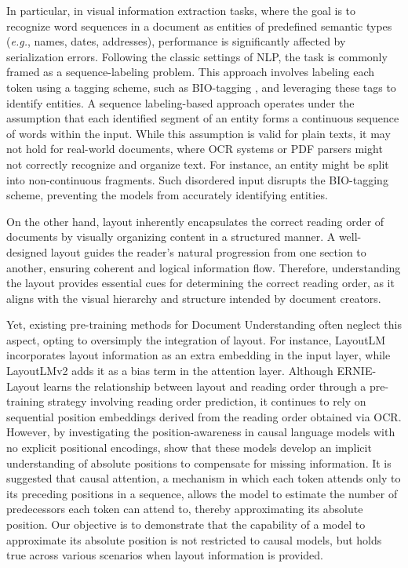 
In particular, in visual information extraction tasks, where the goal is to recognize word sequences in a document as entities of predefined semantic types (\textit{e.g.}, names, dates, addresses), performance is significantly affected by serialization errors. Following the classic settings of \ac{NLP}, the task is commonly framed as a sequence-labeling problem. This approach involves labeling each token using a tagging scheme, such as BIO-tagging \citep{ramshaw1999text}, and leveraging these tags to identify entities. A sequence labeling-based approach operates under the assumption that each identified segment of an entity forms a continuous sequence of words within the input. While this assumption is valid for plain texts, it may not hold for real-world documents, where \ac{OCR} systems or PDF parsers might not correctly recognize and organize text. For instance, an entity might be split into non-continuous fragments. Such disordered input disrupts the BIO-tagging scheme, preventing the models from accurately identifying entities.

On the other hand, layout inherently encapsulates the correct reading order of documents by visually organizing content in a structured manner. A well-designed layout guides the reader's natural progression from one section to another, ensuring coherent and logical information flow. Therefore, understanding the layout provides essential cues for determining the correct reading order, as it aligns with the visual hierarchy and structure intended by document creators. 

Yet, existing pre-training methods for Document Understanding often neglect this aspect, opting to oversimply the integration of layout. For instance, LayoutLM \citep{XYLayoutLM} incorporates layout information as an extra embedding in the input layer, while LayoutLMv2 \citep{xu2020layoutlmv2} adds it as a bias term in the attention layer. Although ERNIE-Layout \citep{peng2022ernie} learns the relationship between layout and reading order through a pre-training strategy involving reading order prediction, it continues to rely on sequential position embeddings derived from the reading order obtained via \ac{OCR}. However, by investigating the position-awareness in causal language models with no explicit positional encodings, \citet{haviv2022transformer} show that these models develop an implicit understanding of absolute positions to compensate for missing information. It is suggested that causal attention, a mechanism in which each token attends only to its preceding positions in a sequence, allows the model to estimate the number of predecessors each token can attend to, thereby approximating its absolute position. Our objective is to demonstrate that the capability of a model to approximate its absolute position is not restricted to causal models, but holds true across various scenarios when layout information is provided.

